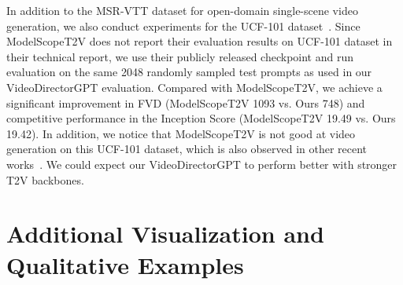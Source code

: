 In addition to the MSR-VTT dataset for open-domain single-scene video generation, we also conduct experiments for the UCF-101 dataset~\citep{soomro2012ucf101}. Since ModelScopeT2V does not report their evaluation results on UCF-101 dataset in their technical report, we use their publicly released checkpoint and run evaluation on the same 2048 randomly sampled test prompts as used in our VideoDirectorGPT evaluation. Compared with ModelScopeT2V, we achieve a significant improvement in FVD (ModelScopeT2V 1093 vs. Ours 748) and competitive performance in the Inception Score (ModelScopeT2V 19.49 vs. Ours 19.42). In addition, we notice that ModelScopeT2V is not good at video generation on this UCF-101 dataset, which is also observed in other recent works~\citep{he2023animate}. We could expect our VideoDirectorGPT to perform better with stronger T2V backbones.



\begin{table}[h]
\centering
{}
\caption{ 
Evaluation results on UCF-101.
\modelscope{}$^\dagger$:
Our replication with 2048 randomly sampled test prompts.
}
\label{table:ucf101}
\end{table}




\section{Additional Visualization and Qualitative Examples}
\label{appendix:visualizations}




